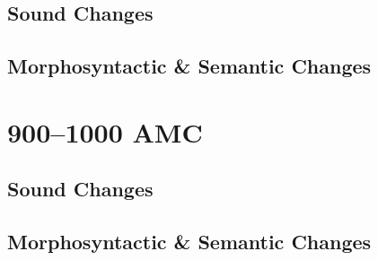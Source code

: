\subsection{Sound Changes}


\subsection{Morphosyntactic \& Semantic Changes}


\section{900--1000 AMC}

\subsection{Sound Changes}


\subsection{Morphosyntactic \& Semantic Changes}



